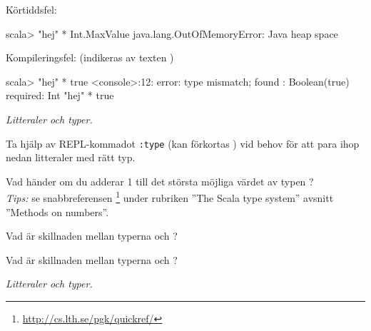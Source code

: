\SubtaskSolved Körtiddsfel:
\begin{REPLnonum}
scala> "hej" * Int.MaxValue
java.lang.OutOfMemoryError: Java heap space
\end{REPLnonum}

\SubtaskSolved Kompileringsfel: (indikeras av texten )
\begin{REPLnonum}
scala> "hej" * true
<console>:12: error: type mismatch;
 found   : Boolean(true)
 required: Int
       "hej" * true
\end{REPLnonum}


\QUESTEND




\def\what{\emph{Litteraler och typer.}}

\QUESTBEGIN

\Task \what

\Subtask Ta hjälp av REPL-kommadot \verb+:type+ (kan förkortas ) vid behov för att para ihop nedan litteraler med rätt typ. 

\begin{ConceptConnections}[0.35\textwidth]

\end{ConceptConnections}

\Subtask Vad händer om du adderar 1 till det största möjliga värdet av typen ? 
\\\emph{Tips:} se snabbreferensen \footnote{\url{http://cs.lth.se/pgk/quickref/}} under rubriken ''The Scala type system'' avsnitt ''Methods on numbers''.

\Subtask Vad är skillnaden mellan typerna  och ?

\Subtask Vad är skillnaden mellan typerna  och ?


\SOLUTION

\TaskSolved \what

\SubtaskSolved 

\begin{ConceptConnections}

\end{ConceptConnections}

